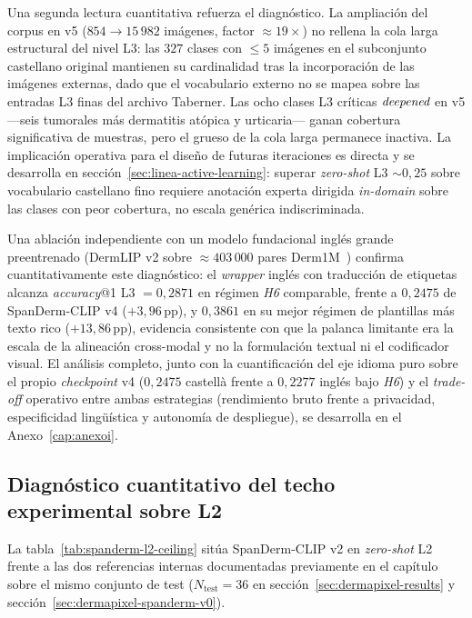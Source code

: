 Una segunda lectura cuantitativa refuerza el diagnóstico. La
ampliación del corpus en v5 ($854 \to 15\,982$ imágenes, factor
$\approx 19\times$) no rellena la cola larga estructural del
nivel L3: las $327$ clases con $\leq 5$ imágenes en el
subconjunto castellano original mantienen su cardinalidad tras
la incorporación de las imágenes externas, dado que el
vocabulario externo no se mapea sobre las entradas L3 finas del
archivo Taberner. Las ocho clases L3 críticas $\emph{deepened}$
en v5 ---seis tumorales más dermatitis atópica y urticaria---
ganan cobertura significativa de muestras, pero el grueso de la
cola larga permanece inactiva. La implicación operativa para el
diseño de futuras iteraciones es directa y se desarrolla en
secci\'on~\ref{sec:linea-active-learning}: superar
\emph{zero-shot} L3 $\sim 0{,}25$ sobre vocabulario castellano
fino requiere anotación experta dirigida \emph{in-domain} sobre
las clases con peor cobertura, no escala genérica
indiscriminada.

Una ablación independiente con un modelo fundacional inglés grande
preentrenado (DermLIP v2 sobre $\approx 403\,000$ pares
Derm1M~\cite{derm1m}) confirma cuantitativamente este
diagnóstico: el \emph{wrapper} inglés con traducción de etiquetas
alcanza \emph{accuracy}@1 L3 $= 0{,}2871$ en régimen \emph{H6}
comparable, frente a $0{,}2475$ de SpanDerm-CLIP v4
($+3{,}96$\,pp), y $0{,}3861$ en su mejor régimen de plantillas
más texto rico ($+13{,}86$\,pp), evidencia consistente con que la
palanca limitante era la escala de la alineación cross-modal y no
la formulación textual ni el codificador visual. El análisis
completo, junto con la cuantificación del eje idioma puro sobre el
propio \emph{checkpoint} v4 ($0{,}2475$ castellà frente a
$0{,}2277$ inglés bajo \emph{H6}) y el \emph{trade-off} operativo
entre ambas estrategias (rendimiento bruto frente a privacidad,
especificidad lingüística y autonomía de despliegue), se
desarrolla en el Anexo~\ref{cap:anexoi}.

\subsection*{Diagnóstico cuantitativo del techo experimental
sobre L2}

La tabla~\ref{tab:spanderm-l2-ceiling} sitúa SpanDerm-CLIP v2 en
\emph{zero-shot} L2 frente a las dos referencias internas
documentadas previamente en el capítulo sobre el mismo conjunto
de test ($N_{\mathrm{test}} = 36$ en
secci\'on~\ref{sec:dermapixel-results} y
secci\'on~\ref{sec:dermapixel-spanderm-v0}).

